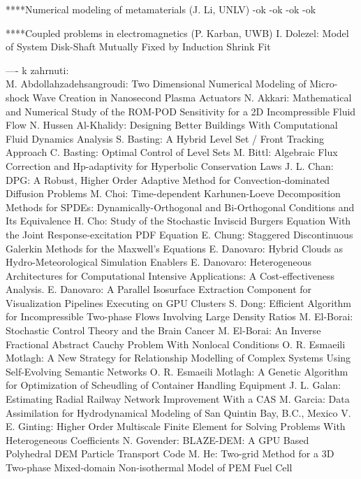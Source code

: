 \documentclass[10pt, A4]{article}%
\begin{document}
****Numerical modeling of metamaterials (J. Li, UNLV)
-ok
-ok
-ok
-ok


****Coupled problems in electromagnetics (P. Karban, UWB)
{I. Dolezel}: {Model of System Disk-Shaft Mutually Fixed by Induction Shrink Fit}




---- k zahrnuti:\\
{M. Abdollahzadehsangroudi}: {Two Dimensional Numerical Modeling of Micro-shock Wave Creation in Nanosecond Plasma Actuators}
{N. Akkari}: {Mathematical and Numerical Study of the ROM-POD Sensitivity for a 2D Incompressible Fluid Flow}
{N. Hussen Al-Khalidy}: {Designing Better Buildings With Computational Fluid Dynamics Analysis}
{S. Basting}: {A Hybrid Level Set / Front Tracking Approach}
{C. Basting}: {Optimal Control of Level Sets}
{M. Bittl}: {Algebraic Flux Correction and Hp-adaptivity for Hyperbolic Conservation Laws}
{J. L. Chan}: {DPG: A Robust, Higher Order Adaptive Method for Convection-dominated Diffusion Problems}
{M. Choi}: {Time-dependent Karhunen-Loeve Decomposition Methods for SPDEs: Dynamically-Orthogonal and Bi-Orthogonal Conditions and Its Equivalence}
{H. Cho}: {Study of the Stochastic Inviscid Burgers Equation With the Joint Response-excitation PDF Equation}
{E. Chung}: {Staggered Discontinuous Galerkin Methods for the Maxwell's Equations}
{E. Danovaro}: {Hybrid Clouds as Hydro-Meteorological Simulation Enablers}
{E. Danovaro}: {Heterogeneous Architectures for Computational Intensive Applications: A Cost-effectiveness Analysis.}
{E. Danovaro}: {A Parallel Isosurface Extraction Component for Visualization Pipelines Executing on GPU Clusters}
{S. Dong}: {Efficient Algorithm for Incompressible Two-phase Flows Involving Large Density Ratios}
{M. El-Borai}: {Stochastic Control Theory and the Brain Cancer}
{M. El-Borai}: {An Inverse Fractional Abstract Cauchy Problem With Nonlocal Conditions}
{O. R. Esmaeili Motlagh}: {A New Strategy for Relationship Modelling of Complex Systems Using Self-Evolving Semantic Networks}
{O. R. Esmaeili Motlagh}: {A Genetic Algorithm for Optimization of Scheudling of Container Handling Equipment}
{J. L. Galan}: {Estimating Radial Railway Network Improvement With a CAS}
{M. Garcia}: {Data Assimilation for Hydrodynamical Modeling of San Quintin Bay, B.C., Mexico}
{V. E. Ginting}: {Higher Order Multiscale Finite Element for Solving Problems With Heterogeneous Coefficients}
{N. Govender}: {BLAZE-DEM: A GPU Based Polyhedral DEM Particle Transport Code}
{M. He}: {Two-grid Method for a 3D Two-phase Mixed-domain Non-isothermal Model of PEM Fuel Cell}
\end{document}
